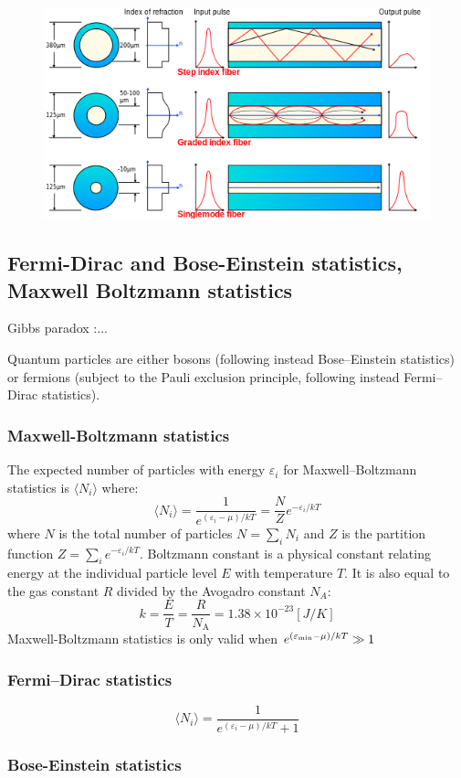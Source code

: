 \documentclass[twocolumn]{article}
\numberwithin{equation}{section}
\begin{document}
\begin{figure}[H]
	\centering
	\includegraphics[width=.5\textwidth]{550px-Optical_fiber_types.png}
\end{figure}


	\subsection{Fermi-Dirac and Bose-Einstein statistics, Maxwell Boltzmann statistics}

Gibbs paradox :...

Quantum particles are either bosons (following instead Bose–Einstein statistics) or fermions (subject to the Pauli exclusion principle, following instead Fermi–Dirac statistics). 

		\subsubsection{Maxwell-Boltzmann statistics}
The expected number of particles with energy $\varepsilon_i$ for Maxwell–Boltzmann statistics is $\langle N_i \rangle$ where:
$$\langle N_i \rangle = \frac {1} {e^{(\varepsilon_i-\mu)/kT}} = \frac{N}{Z} e^{-\varepsilon_i/kT}$$
where $N$ is the total number of particles $N=\sum_i N_i$ and $Z$ is the partition function $Z=\sum_i e^{-\varepsilon_i/kT}$. 
Boltzmann constant is a physical constant relating energy at the individual particle level $E$ with temperature $T$. It is also equal to the gas constant $R$ divided by the Avogadro constant $N_A$:
$$k = \frac{E}{T} = \frac{R}{N_\text{A}} = 1.38\times 10^{−23} [J/K]$$
Maxwell-Boltzmann statistics is only valid when $e^{(\varepsilon_{\rm min}-\mu)/kT} \gg 1$


		\subsubsection{Fermi–Dirac statistics}
		
$$\langle N_i \rangle = \frac{1}{e^{(\varepsilon_i-\mu)/kT}+ 1}$$


		\subsubsection{Bose-Einstein statistics}
\end{document}
